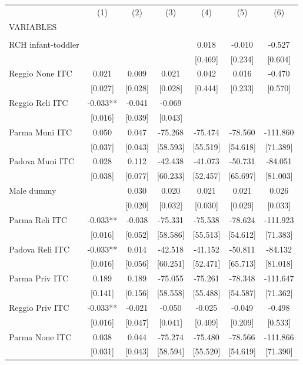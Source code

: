 \begin{tabular}{lcccccc} \hline
 & (1) & (2) & (3) & (4) & (5) & (6) \\
VARIABLES &  &  &  &  &  &  \\ \hline
 &  &  &  &  &  &  \\
RCH infant-toddler &  &  &  & 0.018 & -0.010 & -0.527 \\
 &  &  &  & [0.469] & [0.234] & [0.604] \\
Reggio None ITC & 0.021 & 0.009 & 0.021 & 0.042 & 0.016 & -0.470 \\
 & [0.027] & [0.028] & [0.028] & [0.444] & [0.233] & [0.570] \\
Reggio Reli ITC & -0.033** & -0.041 & -0.069 &  &  &  \\
 & [0.016] & [0.039] & [0.043] &  &  &  \\
Parma Muni ITC & 0.050 & 0.047 & -75.268 & -75.474 & -78.560 & -111.860 \\
 & [0.037] & [0.043] & [58.593] & [55.519] & [54.618] & [71.389] \\
Padova Muni ITC & 0.028 & 0.112 & -42.438 & -41.073 & -50.731 & -84.051 \\
 & [0.038] & [0.077] & [60.233] & [52.457] & [65.697] & [81.003] \\
Male dummy &  & 0.030 & 0.020 & 0.021 & 0.021 & 0.026 \\
 &  & [0.020] & [0.032] & [0.030] & [0.029] & [0.033] \\
Parma Reli ITC & -0.033** & -0.038 & -75.331 & -75.538 & -78.624 & -111.923 \\
 & [0.016] & [0.052] & [58.586] & [55.513] & [54.612] & [71.383] \\
Padova Reli ITC & -0.033** & 0.014 & -42.518 & -41.152 & -50.811 & -84.132 \\
 & [0.016] & [0.056] & [60.251] & [52.471] & [65.713] & [81.018] \\
Parma Priv ITC & 0.189 & 0.189 & -75.055 & -75.261 & -78.348 & -111.647 \\
 & [0.141] & [0.156] & [58.558] & [55.488] & [54.587] & [71.362] \\
Reggio Priv ITC & -0.033** & -0.021 & -0.050 & -0.025 & -0.049 & -0.498 \\
 & [0.016] & [0.047] & [0.041] & [0.409] & [0.209] & [0.533] \\
Parma None ITC & 0.038 & 0.044 & -75.274 & -75.480 & -78.566 & -111.866 \\
 & [0.031] & [0.043] & [58.594] & [55.520] & [54.619] & [71.390] \\

\end{tabular}
